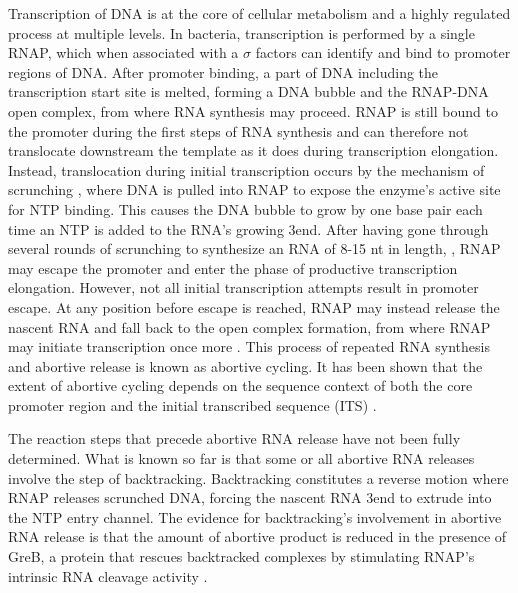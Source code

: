 %
Transcription of DNA is at the core of cellular metabolism and a highly
regulated process at multiple levels. In bacteria, transcription is performed
by a single RNAP, which when associated with a $\sigma$ factors can identify
and bind to promoter regions of DNA. After promoter binding, a part of DNA
including the transcription start site is melted, forming a DNA bubble and the
RNAP-DNA open complex, from where RNA synthesis may proceed. RNAP is still
bound to the promoter during the first steps of RNA synthesis and can
therefore not translocate downstream the template as it does during
transcription elongation. Instead, translocation during initial transcription
occurs by the mechanism of scrunching \cite{revyakin_abortive_2006,
kapanidis_initial_2006}, where DNA is pulled into RNAP to expose the enzyme's
active site for NTP binding. This causes the DNA bubble to grow by one base
pair each time an NTP is added to the RNA's growing 3\ppp end. After having
gone through several rounds of scrunching to synthesize an RNA of 8-15 nt in
length,
\cite{carpousis_cycling_1980,hsu_vitro_2003,tang_real-time_2009,hsu_initial_2006},
RNAP may escape the promoter and enter the phase of productive transcription
elongation. However, not all initial transcription attempts result in promoter
escape. At any position before escape is reached, RNAP may instead release the
nascent RNA and fall back to the open complex formation, from where RNAP may
initiate transcription once more \cite{carpousis_cycling_1980}. This process of
repeated RNA synthesis and abortive release is known as abortive cycling. It
has been shown that the extent of abortive cycling depends on the sequence
context of both the core promoter region and the initial transcribed
sequence (ITS) \cite{hsu_initial_2006, hsu_promoter_2002, vo_vitro_2003}.

The reaction steps that precede abortive RNA release have not been fully
determined. What is known so far is that some or all abortive RNA releases
involve the step of backtracking. Backtracking constitutes a reverse motion
where RNAP releases scrunched DNA, forcing the nascent RNA 3\ppp end to
extrude into the NTP entry channel. The evidence for backtracking's
involvement in abortive RNA release is that the amount of abortive product is
reduced in the presence of GreB, a protein that rescues backtracked complexes
by stimulating RNAP's intrinsic RNA cleavage activity
\cite{hsu_initial_2006,hsu_escherichia_1995,feng_grea-induced_1994}.

